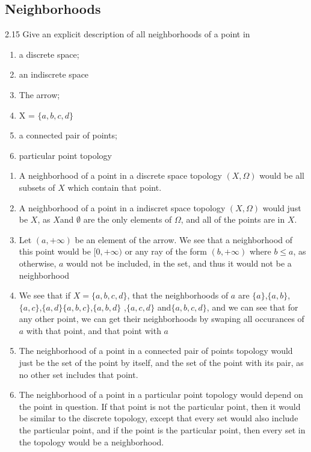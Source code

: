 \subsection{Neighborhoods}
2.15 Give an explicit description of all neighborhoods of a point in
\begin{enumerate}
\item a discrete space;
\item an indiscrete space
\item The arrow;
\item X = $\{a,b,c,d\}$
\item a connected pair of points;
\item particular point topology
\end{enumerate}

\begin{enumerate}
  \item A neighborhood of a point in a discrete space topology $(X,\Omega)$ would
    be all subsets of $X$ which contain that point.
  \item A neighborhood of a point in a indiscret space topology
    $(X,\Omega)$ would just be $X$, as $X$and $\emptyset$ are the only
    elements of $\Omega$, and all of the points are in $X$.
  \item Let $(a,+\infty)$ be an element of the arrow. We see that a
    neighborhood of this point would be $[0,+\infty)$ or any ray of the form
    $(b,+\infty)$ where $b\leq a$, as otherwise, $a$ would not be
    included, in the set, and thus it would not be a neighborhood
  \item We see that if $X = \{a,b,c,d\}$, that the neighborhoods of
    $a$ are
    $\{a\}$,$\{a,b\}$,$\{a,c\}$,$\{a,d\}$$\{a,b,c\}$,$\{a,b,d\}$
    ,$\{a,c,d\}$  and$\{a,b,c,d\}$, and we can see that for any other
    point, we can get their neighborhoods by swaping all occurances of
    $a$ with that point, and that point with $a$
  \item The neighborhood of a point in a connected pair of points
    topology would just be the set of the point by itself, and the set
    of the point with its pair, as no other set includes that point.
  \item The neighborhood of a point in a particular point topology
    would depend on the point in question. If that point is not the
    particular point, then it would be similar to the discrete
    topology, except that every set would also include the particular
    point, and if the point is the particular point, then every set in
    the topology would be a neighborhood.
\end{enumerate}